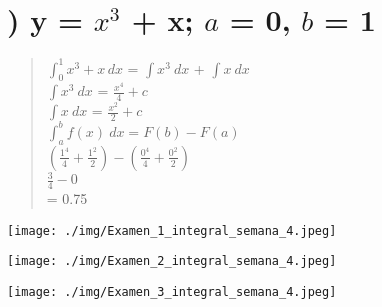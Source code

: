 \documentclass[12pt]{article}
\begin{document}
\newpage

\fontsize{15}{40}\selectfont
\section*{) y = $x^3$ + x; $a$ = 0, $b$ = 1} \label{fig_amorfas:problema_3}

\begin{quote}
  $\int_{0}^{1} x^3 + x \,dx$ = $\int x^3\ dx$ + $\int x\ dx$ \\
  $\int x^3\ dx $ = $\frac{x^4}{4} + c$ \\
  $\int x\ dx $ = $\frac{x^2}{2} + c$ \\
  $\int_{a}^{b} f(x)\ dx = F(b) - F(a)$ \\
  $(\frac{1^4}{4} + \frac{1^2}{2})  -  (\frac{0^4}{4} + \frac{0^2}{2})$ \\
  $\frac{3}{4} - 0 $ \\
  = 0.75
\end{quote}

\newpage

\texttt{[image: ./img/Examen\_1\_integral\_semana\_4.jpeg]}

\newpage

\texttt{[image: ./img/Examen\_2\_integral\_semana\_4.jpeg]}

\newpage

\texttt{[image: ./img/Examen\_3\_integral\_semana\_4.jpeg]}
\end{document}
